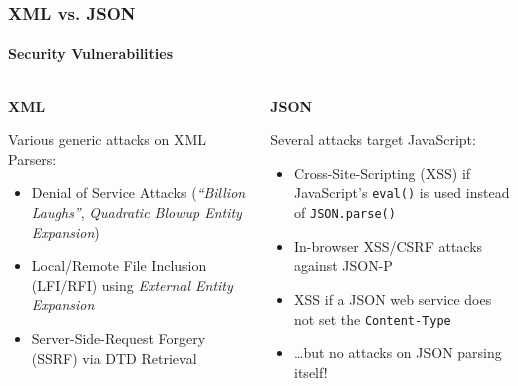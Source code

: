 \documentclass[
    alternativetitlepage=bild,
    cornerlogo=hgi_nds_logo2,
    sectionoverview,
]{rubpresentation}
\begin{document}
\begin{frame}[plain]
    \frametitle{XML vs. JSON}
    \framesubtitle{Security Vulnerabilities}
    \begin{columns}[t]
        \begin{column}{0.5\textwidth}
            \begin{center}\textbf{\Large XML}\end{center}
            Various generic attacks on XML Parsers:
            \begin{itemize}
                \item{} Denial of Service Attacks %
                        (\emph{\enquote{Billion Laughs}}, %
                        \emph{Quadratic Blowup Entity Expansion})\\
                \item{} Local/Remote File Inclusion (LFI/RFI) using %
                        \emph{External Entity Expansion}\\
                \item{} Server-Side-Request Forgery (SSRF) via DTD Retrieval\\
            \end{itemize}
        \end{column}
        \begin{column}{0.5\textwidth}
            \begin{center}\textbf{\Large JSON}\end{center}
            Several attacks target JavaScript:
            \begin{itemize}
                \item{} Cross-Site-Scripting (XSS) if JavaScript's %
                        \texttt{eval()} is used instead of%
                        \texttt{JSON.parse()}\\
                \item{} In-browser XSS/CSRF attacks against JSON-P\\
                \item{} XSS if a JSON web service does not set the
                        \texttt{Content-Type}\\
                \item{} \ldots{}but no attacks on JSON parsing itself!\\
            \end{itemize}
        \end{column}
    \end{columns}
\end{frame}
\end{document}

